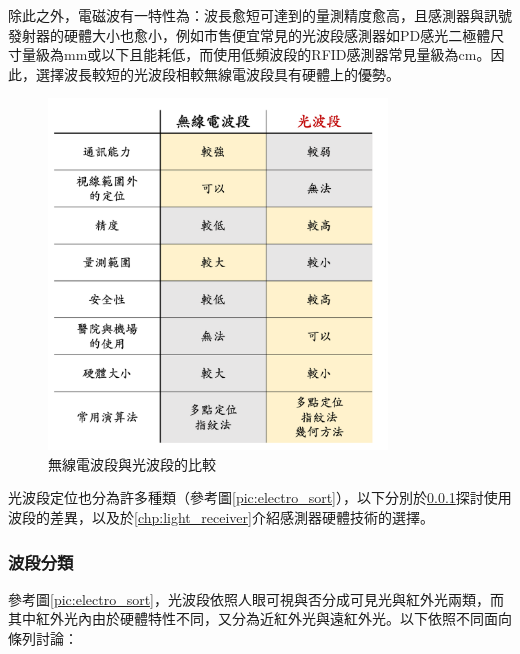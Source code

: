             除此之外，電磁波有一特性為：波長愈短可達到的量測精度愈高，且感測器與訊號發射器的硬體大小也愈小，例如市售便宜常見的光波段感測器如PD感光二極體尺寸量級為mm或以下\cite{datasheet:led_sfh4545}且能耗低，而使用低頻波段的RFID感測器常見量級為cm\cite{datasheet:rfid_tag}。因此，選擇波長較短的光波段相較無線電波段具有硬體上的優勢。

            \begin{figure}[h]
                \centering
                \includegraphics[width=9cm]{ch2pic/method_compare.png}
                \caption{無線電波段與光波段的比較}
                \label{pic:method_compare}
            \end{figure}


            光波段定位也分為許多種類（參考圖\ref{pic:electro_sort}），以下分別於\ref{chp:light_electro}探討使用波段的差異，以及於\ref{chp:light_receiver}介紹感測器硬體技術的選擇。


            \subsubsection{波段分類}

            \label{chp:light_electro}

            參考圖\ref{pic:electro_sort}，光波段依照人眼可視與否分成可見光與紅外光兩類，而其中紅外光內由於硬體特性不同，又分為近紅外光與遠紅外光。以下依照不同面向條列討論：

